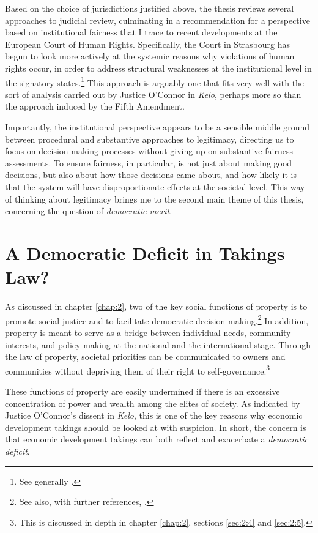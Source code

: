 Based on the choice of jurisdictions justified above, the thesis reviews several approaches to judicial review, culminating in a recommendation for a perspective based on institutional fairness that I trace to recent developments at the European Court of Human Rights. Specifically, the Court in Strasbourg has begun to look more actively at the systemic reasons why violations of human rights occur, in order to address structural weaknesses at the institutional level in the signatory states.\footnote{See generally \cite{leach10}.} This approach is arguably one that fits very well with the sort of analysis carried out by Justice O'Connor in {\it Kelo}, perhaps more so than the approach induced by the Fifth Amendment.

Importantly, the institutional perspective appears to be a sensible middle ground between procedural and substantive approaches to legitimacy, directing us to focus on decision-making processes without giving up on substantive fairness assessments. To ensure fairness, in particular, is not just about making good decisions, but also about how those decisions came about, and how likely it is that the system will have disproportionate effects at the societal level. This way of thinking about legitimacy brings me to the second main theme of this thesis, concerning the question of {\it democratic merit}.

\section{A Democratic Deficit in Takings Law?}\label{sec:1:2}

As discussed in chapter \ref{chap:2}, two of the key social functions of property is to promote social justice and to facilitate democratic decision-making.\footnote{See also, with further references, \cite{rose96,jackson10}.} In addition, property is meant to serve as a bridge between individual needs, community interests, and policy making at the national and the international stage. Through the law of property, societal priorities can be communicated to owners and communities without depriving them of their right to self-governance.\footnote{This is discussed in depth in chapter \ref{chap:2}, sections \ref{sec:2:4} and \ref{sec:2:5}.}

These functions of property are easily undermined if there is an excessive concentration of power and wealth among the elites of society. As indicated by Justice O'Connor's dissent in {\it Kelo}, this is one of the key reasons why economic development takings should be looked at with suspicion. In short, the concern is that economic development takings can both reflect and exacerbate a {\it democratic deficit}.

